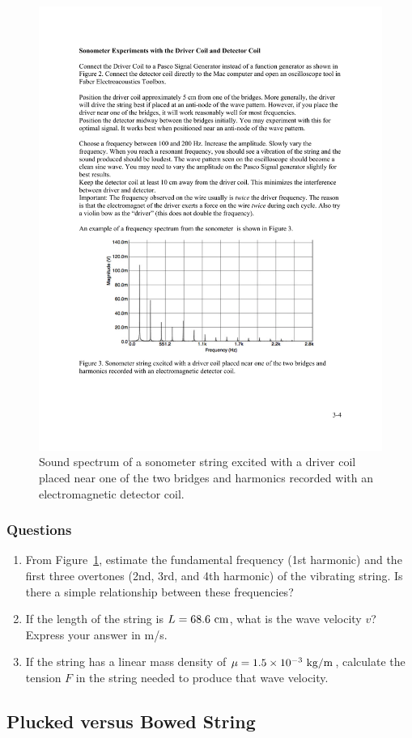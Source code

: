 \documentclass[11pt]{NSF}
\def\ben{\begin{enumerate}}
\def\een{\end{enumerate}}
\def\i{\item{}}
\begin{document}
%
%
\begin{figure}[hbtp] 
\begin{center} 
\includegraphics[width=.7\textwidth]{fig3_3}
\caption{Sound spectrum of a 
sonometer string excited with a driver coil placed near one of the 
two bridges and harmonics recorded with an electromagnetic detector coil.}
\label{f:3} 
\end{center} 
\end{figure}
%

\subsubsection*{Questions}
\ben
\i From Figure~\ref{f:3}, estimate the fundamental frequency (1st harmonic)
and the first three overtones (2nd, 3rd, and 4th harmonic) of the vibrating
string.
Is there a simple relationship between these frequencies?

\i If the length of the string is $L=68.6~{\rm cm}$, what is the wave velocity $v$?
Express your answer in m/s.

\i If the string has a linear mass density of $\mu = 1.5\times 10^{-3}~{\rm kg/m}$,
calculate the tension $F$ in the string needed to 
produce that wave velocity.
\een

\subsection{Plucked versus Bowed String}
\end{document}
